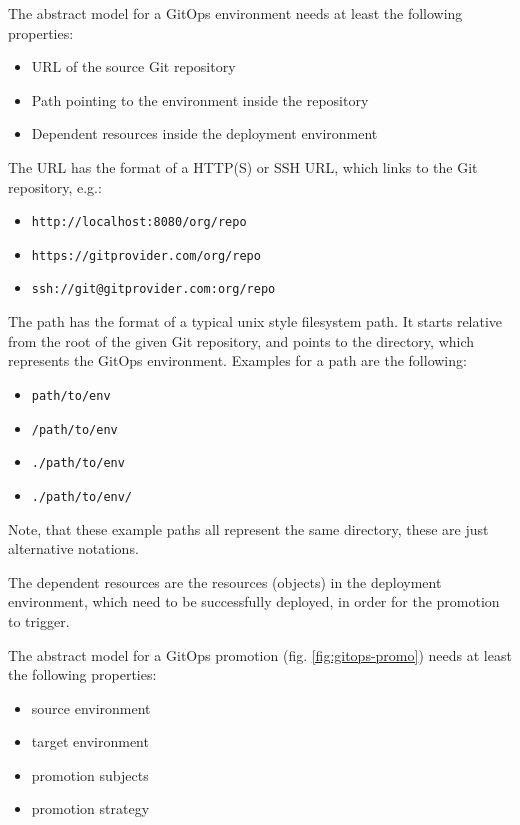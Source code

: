 The abstract model for a GitOps environment needs at least the following properties:

\begin{itemize}
	\item URL of the source Git repository
	\item Path pointing to the environment inside the repository
	\item Dependent resources inside the deployment environment
\end{itemize}

The URL has the format of a HTTP(S) or SSH URL,
which links to the Git repository,
e.g.:

\begin{itemize}
	\item \lstinline|http://localhost:8080/org/repo|
	\item \lstinline|https://gitprovider.com/org/repo|
	\item \lstinline|ssh://git@gitprovider.com:org/repo|
\end{itemize}

The path has the format of a typical unix style filesystem path.
It starts relative from the root of the given Git repository,
and points to the directory, which represents the GitOps environment.
Examples for a path are the following:

\begin{itemize}
	\item \lstinline|path/to/env|
	\item \lstinline|/path/to/env|
	\item \lstinline|./path/to/env|
	\item \lstinline|./path/to/env/|
\end{itemize}

Note, that these example paths all represent the same directory,
these are just alternative notations.

The dependent resources are the resources (objects) in the deployment environment,
which need to be successfully deployed, in order for the promotion to trigger.

The abstract model for a GitOps promotion
(fig. \ref{fig:gitops-promo})
needs at least the following properties:

\begin{itemize}
	\item source environment
	\item target environment
	\item promotion subjects
	\item promotion strategy
\end{itemize}

